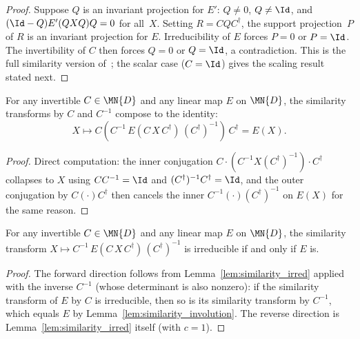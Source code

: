 \begin{proof}
    \leanok
    Suppose $Q$ is an invariant projection for $E'$:
    $Q \neq 0$, $Q \neq \Id$, and
    $(\Id - Q) E'(Q X Q) Q = 0$ for all~$X$.
    Setting $R = C Q C^\dagger$, the support projection~$P$ of $R$
    is an invariant projection for $E$.
    Irreducibility of $E$ forces $P = 0$ or $P = \Id$.
    The invertibility of $C$ then forces $Q = 0$ or $Q = \Id$,
    a contradiction.
    This is the full similarity version of~\cite[Proposition~6.6]{Wolf2012Quantum};
    the scalar case ($C = \Id$) gives the scaling result stated next.
\end{proof}

\begin{lemma}%
    \label{lem:similarity_involution}
    \leanok
    For any invertible $C \in \MN{D}$ and any linear map $E$ on $\MN{D}$,
    the similarity transforms by $C$ and $C^{-1}$ compose to the identity:
    \[
        X \mapsto C(C^{-1}\, E(C\,X\,C^\dagger)\,(C^\dagger)^{-1})\,C^\dagger
        = E(X).
    \]
\end{lemma}

\begin{proof}\leanok
    Direct computation: the inner conjugation
    $C \cdot (C^{-1} X (C^\dagger)^{-1}) \cdot C^\dagger$ collapses to $X$
    using $C C^{-1} = \Id$ and $(C^\dagger)^{-1} C^\dagger = \Id$, and the
    outer conjugation by $C (\cdot) C^\dagger$ then cancels the inner
    $C^{-1} (\cdot) (C^\dagger)^{-1}$ on $E(X)$ for the same reason.
\end{proof}

\begin{lemma}%
    \label{lem:similarity_irred_iff}
    \leanok
    For any invertible $C \in \MN{D}$ and any linear map $E$ on $\MN{D}$,
    the similarity transform
    $X \mapsto C^{-1}\, E(C\,X\,C^\dagger)\,(C^\dagger)^{-1}$
    is irreducible if and only if $E$ is.
\end{lemma}

\begin{proof}\leanok
    The forward direction follows from Lemma~\ref{lem:similarity_irred}
    applied with the inverse $C^{-1}$ (whose determinant is also nonzero):
    if the similarity transform of $E$ by $C$ is irreducible, then so is its
    similarity transform by $C^{-1}$, which equals $E$ by
    Lemma~\ref{lem:similarity_involution}. The reverse direction is
    Lemma~\ref{lem:similarity_irred} itself (with $c = 1$).
\end{proof}

